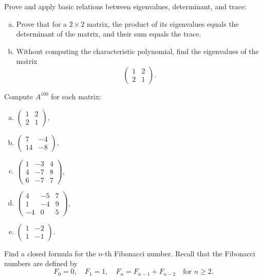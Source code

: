 \begin{problem}
Prove and apply basic relations between eigenvalues, determinant, and trace:
\begin{enumerate}[a) ]
\item Prove that for a $2\times 2$ matrix, the product of its eigenvalues equals the determinant of the matrix, and their sum equals the trace.
\item Without computing the characteristic polynomial, find the eigenvalues of the matrix
$$\begin{pmatrix}1 & 2\\ 2 & 1\end{pmatrix}.$$
\end{enumerate}
\end{problem}

\begin{problem}
Compute $A^{100}$ for each matrix:
\begin{enumerate}[a) ]
\item $\begin{pmatrix}1 & 2\\ 2 & 1\end{pmatrix}$,
\item $\begin{pmatrix}7 & -4\\ 14 & -8\end{pmatrix}$,
\item $\begin{pmatrix}1 & -3 & 4 \\ 4 & -7 & 8 \\ 6 & -7 & 7\end{pmatrix}$,
\item $\begin{pmatrix}4 & -5 & 7 \\ 1 & -4 & 9 \\ -4 & 0 & 5\end{pmatrix}$,
\item $\begin{pmatrix}1 & -2 \\ 1 & -1\end{pmatrix}$.
\end{enumerate}
\end{problem}

\begin{problem}
Find a closed formula for the $n$-th Fibonacci number. Recall that the Fibonacci numbers are defined by
$$
F_0 = 0, \quad F_1 = 1, \quad F_n = F_{n-1} + F_{n-2} \quad \text{for } n \geq 2.
$$
\end{problem}

